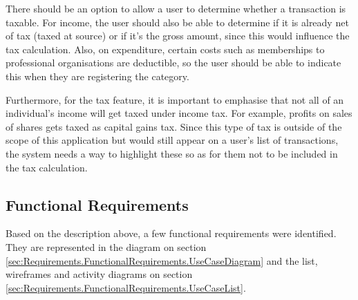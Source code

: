 There should be an option to allow a user to determine whether a transaction is
taxable. For income, the user should also be able to determine if it is already
net of tax (taxed at source) or if it's the gross amount, since this would
influence the tax calculation. Also, on expenditure, certain costs such as
memberships to professional organisations are deductible, so the user should be
able to indicate this when they are registering the category.

Furthermore, for the tax feature, it is important to emphasise that not all of
an individual's income will get taxed under income tax. For example, profits on
sales of shares gets taxed as capital gains tax. Since this type of tax is
outside of the scope of this application but would still appear on a user's
list of transactions, the system needs a way to highlight these so as for them
not to be included in the tax calculation.


\subsection{Functional Requirements} \label{sec:Requirements.FunctionalRequirements}

Based on the description above, a few functional requirements were identified.
They are represented in the diagram on section
\ref{sec:Requirements.FunctionalRequirements.UseCaseDiagram} and the list,
wireframes and activity diagrams on section
\ref{sec:Requirements.FunctionalRequirements.UseCaseList}.

